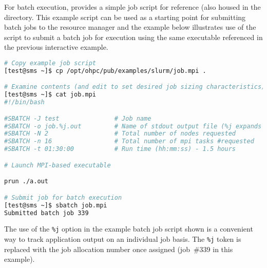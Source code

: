 For batch execution, \OHPC{} provides a simple job script for reference (also
housed in the  directory. This example script can
be used as a starting point for submitting batch jobs to the resource manager
and the example below illustrates use of the script to submit a batch job for
execution using the same executable referenced in the previous interactive example.

\begin{lstlisting}[language=bash,keywords={}]
# Copy example job script
[test@sms ~]$ cp /opt/ohpc/pub/examples/slurm/job.mpi .

# Examine contents (and edit to set desired job sizing characteristics)
[test@sms ~]$ cat job.mpi
#!/bin/bash

#SBATCH -J test               # Job name
#SBATCH -o job.%j.out         # Name of stdout output file (%j expands to %jobId)
#SBATCH -N 2                  # Total number of nodes requested
#SBATCH -n 16                 # Total number of mpi tasks #requested
#SBATCH -t 01:30:00           # Run time (hh:mm:ss) - 1.5 hours

# Launch MPI-based executable

prun ./a.out

# Submit job for batch execution
[test@sms ~]$ sbatch job.mpi
Submitted batch job 339
\end{lstlisting}

\begin{center}
\begin{tcolorbox}[]
\small
The use of the \texttt{\%j} option in the example batch job script shown is a convenient
way to track application output on an individual job basis. The \texttt{\%j} token
is replaced with the \SLURM{} job allocation number once assigned (job~\#339 in
this example).
\end{tcolorbox}
\end{center}


